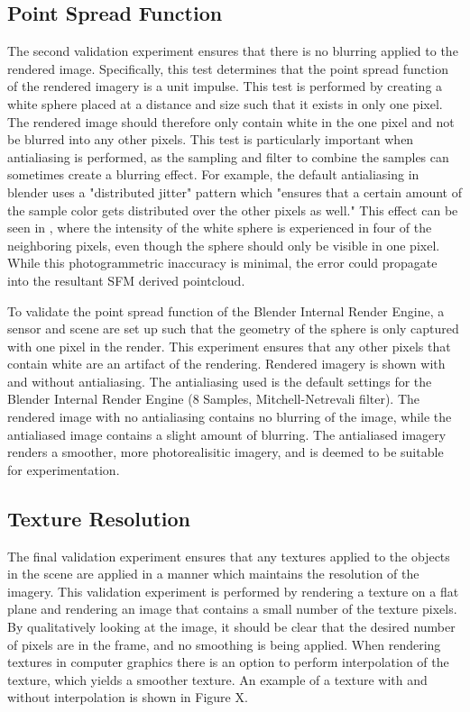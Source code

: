 

\subsection{Point Spread Function}
The second validation experiment ensures that there is no blurring applied to the rendered image.  Specifically, this test determines that the point spread function of the rendered imagery is a unit impulse.  This test is performed by creating a white sphere placed at a distance and size such that it exists in only one pixel.  The rendered image should therefore only contain white in the one pixel and not be blurred into any other pixels.  This test is particularly important when antialiasing is performed, as the sampling and filter to combine the samples can sometimes create a blurring effect.  For example, the default antialiasing in blender uses a "distributed jitter" pattern which "ensures that a certain amount of the sample color gets distributed over the other pixels as well."  This effect can be seen in , where the intensity of the white sphere is experienced in four of the neighboring pixels, even though the sphere should only be visible in one pixel.  While this photogrammetric inaccuracy is minimal, the error could propagate into the resultant SFM derived pointcloud.



To validate the point spread function of the Blender Internal Render Engine, a sensor and scene are set up such that the geometry of the sphere is only captured with one pixel in the render.  This experiment ensures that any other pixels that contain white are an artifact of the rendering.  Rendered imagery is shown with and without antialiasing.  The antialiasing used is the default settings for the Blender Internal Render Engine (8 Samples, Mitchell-Netrevali filter).  The rendered image with no antialiasing contains no blurring of the image, while the antialiased image contains a slight amount of blurring.  The antialiased imagery renders a smoother, more photorealisitic imagery, and is deemed to be suitable for experimentation. 

\subsection{Texture Resolution}
The final validation experiment ensures that any textures applied to the objects in the scene are applied in a manner which maintains the resolution of the imagery.  This validation experiment is performed by rendering a texture on a flat plane and rendering an image that contains a small number of the texture pixels.  By qualitatively looking at the image, it should be clear that the desired number of pixels are in the frame, and no smoothing is being applied.  When rendering textures in computer graphics there is an option to perform interpolation of the texture, which yields a smoother texture.  An example of a texture with and without interpolation is shown in Figure X. 


